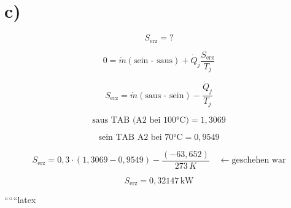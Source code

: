 

\section*{c)}

\[
S_{\text{erz}} = ?
\]

\[
0 = \dot{m} (\text{sein - saus}) + \dot{Q}_j \frac{S_{\text{erz}}}{T_j}
\]

\[
S_{\text{erz}} = \dot{m} (\text{saus - sein}) - \frac{\dot{Q}_j}{T_j}
\]

\[
\text{saus TAB (A2 bei 100°C)} = 1{,}3069
\]

\[
\text{sein TAB A2 bei 70°C} = 0{,}9549
\]

\[
S_{\text{erz}} = 0{,}3 \cdot (1{,}3069 - 0{,}9549) - \frac{(-63{,}652)}{273 \, K} \quad \leftarrow \text{geschehen war}
\]

\[
S_{\text{erz}} = 0{,}32147 \, \text{kW}
\]

``````latex